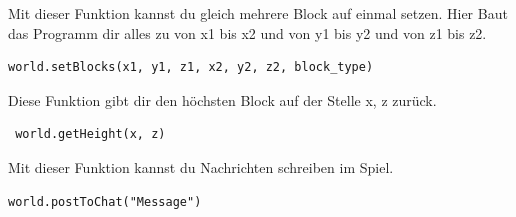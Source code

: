  Mit dieser Funktion kannst du gleich mehrere Block auf einmal setzen. Hier Baut das Programm dir alles zu von x1 bis x2 und von y1 bis y2 und von z1 bis z2.

\lstset{language=Python}
\lstset{frame=lines}
\lstset{basicstyle=\footnotesize}
\begin{lstlisting}
world.setBlocks(x1, y1, z1, x2, y2, z2, block_type)
\end{lstlisting}

Diese Funktion gibt dir den höchsten Block auf der Stelle x, z zurück. 

\lstset{language=Python}
\lstset{frame=lines}
\lstset{basicstyle=\footnotesize}
\begin{lstlisting}
 world.getHeight(x, z)
\end{lstlisting}

Mit dieser Funktion kannst du Nachrichten schreiben im Spiel.

\lstset{language=Python}
\lstset{frame=lines}
\lstset{basicstyle=\footnotesize}
\begin{lstlisting}
world.postToChat("Message")
\end{lstlisting}
